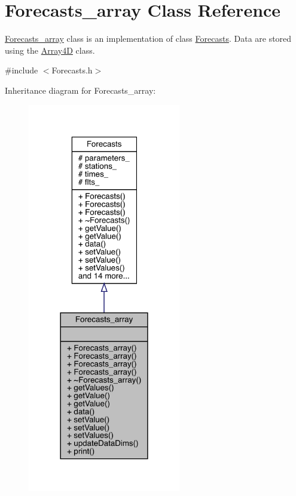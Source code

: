 \hypertarget{class_forecasts__array}{}\section{Forecasts\+\_\+array Class Reference}
\label{class_forecasts__array}


\mbox{\hyperlink{class_forecasts__array}{Forecasts\+\_\+array}} class is an implementation of class \mbox{\hyperlink{class_forecasts}{Forecasts}}. Data are stored using the \mbox{\hyperlink{class_array4_d}{Array4D}} class.  




{\ttfamily \#include $<$Forecasts.\+h$>$}



Inheritance diagram for Forecasts\+\_\+array\+:
\nopagebreak
\begin{figure}[H]
\begin{center}
\leavevmode
\includegraphics[width=189pt]{class_forecasts__array__inherit__graph}
\end{center}
\end{figure}


